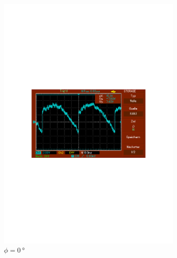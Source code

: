 \begin{figure}
  \centering
  \begin{subfigure}{0.3\textwidth}
      \centering
      \includegraphics[width=\textwidth]{Daten/Noise/0.pdf}
      \caption{$\phi = \SI{0}{\degree}$}
      \label{fig:0n}
  \end{subfigure}
  \begin{subfigure}{0.3\textwidth}
      \centering

\end{subfigure}
\end{figure}
